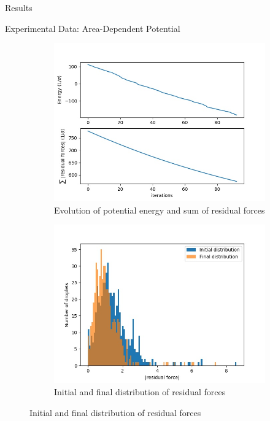 \documentclass[12pt]{article}
\begin{document}
\begin{section}{Results}
\newpage
\begin{subsection}{Experimental Data: Area-Dependent Potential}
\begin{figure}[h!]
    \begin{subfigure}{0.5\textwidth}
        \includegraphics[width=\linewidth]{images/emulsion_UandF.jpeg}
        \caption{Evolution of potential energy and sum of residual forces}
        \label{fig:sub1}
    \end{subfigure}
    \begin{subfigure}{0.5\textwidth}
        \includegraphics[width=\linewidth]{images/emulsion_residual_histogram.jpg}
        \caption{Initial and final distribution of residual forces}
        \label{fig:sub2}
    \end{subfigure}

\end{figure}
\end{subsection}
\end{section}
\end{document}
